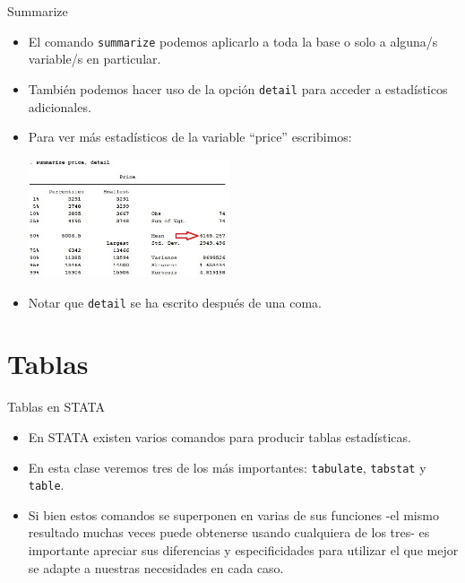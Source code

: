 \documentclass{beamer}
\begin{document}
\begin{frame}{Summarize}
\begin{itemize}
\item El comando \texttt{summarize} podemos aplicarlo a toda la base o solo a alguna/s variable/s en particular.
\item También podemos hacer uso de la opción \texttt{detail} para acceder a estadísticos adicionales. 
\item Para ver más estadísticos de la variable ``price'' escribimos:
\centerline{\includegraphics[height=3.5cm]{summarize1.jpg}}
\item Notar que \texttt{detail} se ha escrito después de una coma.
\end{itemize}
\end{frame}

\section{Tablas}
\begin{frame}{Tablas en STATA}
\begin{itemize}
\item En STATA existen varios comandos para producir tablas estadísticas. 
\item En esta clase veremos tres de los más importantes: \texttt{tabulate}, \texttt{tabstat} y \texttt{table}.
\item Si bien estos comandos se superponen en varias de sus funciones -el mismo resultado muchas veces puede obtenerse usando cualquiera de los tres- es importante apreciar sus diferencias y especificidades para utilizar el que mejor se adapte a nuestras necesidades en cada caso.
\end{itemize}
\end{frame}
\end{document}
